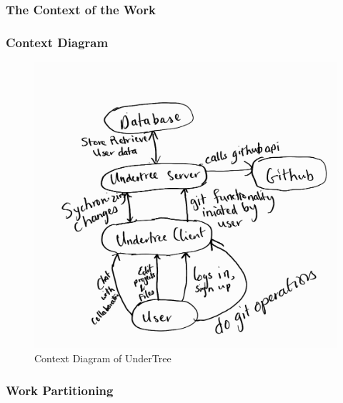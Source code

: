 \documentclass[12pt, titlepage]{article}
\begin{document}
	\subsubsection{The Context of the Work}
	
	\subsubsection{Context Diagram}
	
	\begin{figure}[H]
		\centering
		\includegraphics[scale=0.4]{context.jpg}
		\caption{Context Diagram of UnderTree}
	\end{figure}
	\newpage
	\subsubsection{Work Partitioning}
	
\end{document}
